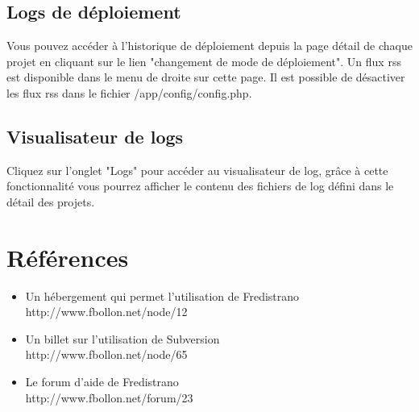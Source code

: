 \documentclass[12pt,a4paper]{report}
\begin{document}
\section{Logs de déploiement}
Vous pouvez accéder à l'historique de déploiement depuis la page détail de chaque projet en cliquant sur le lien "changement de mode de déploiement". Un flux rss est disponible dans le menu de droite sur cette page. Il est possible de désactiver les flux rss dans le fichier /app/config/config.php.

\section{Visualisateur de logs}
Cliquez sur l'onglet "Logs" pour accéder au visualisateur de log, grâce à cette fonctionnalité vous pourrez afficher le contenu des fichiers de log défini dans le détail des projets.

\chapter{Références}
\begin{itemize}
\item Un hébergement qui permet l'utilisation de Fredistrano \\ http://www.fbollon.net/node/12 \\
\item Un billet sur l'utilisation de Subversion \\ http://www.fbollon.net/node/65 \\
\item Le forum d'aide de Fredistrano \\ http://www.fbollon.net/forum/23
\end{itemize}
\end{document}
